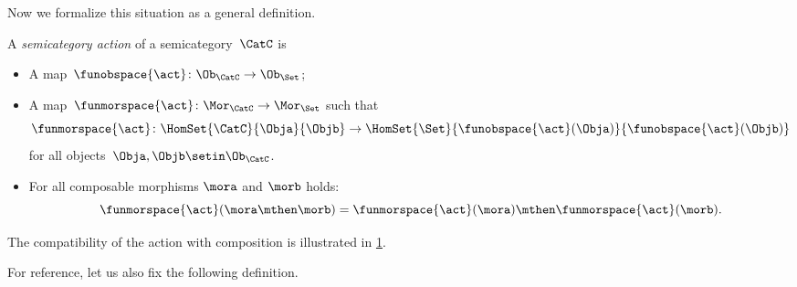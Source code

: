 Now we formalize this situation as a general definition.

\begin{ctdefinition}
    \label{def:semicategory-action}
    A \emph{semicategory action} of a semicategory~$\CatC$ is

    \constit
    \begin{itemize}
        \item A map~$\funobspace{\act} \colon \Ob_{\CatC} \to \Ob_{\Set}$;
        \item A map~$\funmorspace{\act} \colon \Mor_\CatC \to \Mor_\Set$ such that
              \begin{equation}
                  \funmorspace{\act} \colon  \HomSet{\CatC}{\Obja}{\Objb} \to \HomSet{\Set}{ \funobspace{\act}(\Obja)}{\funobspace{\act}(\Objb)}
              \end{equation}
              for all objects~$\Obja, \Objb \setin \Ob_{\CatC}$.
    \end{itemize}

    \condit

    \begin{itemize}
        \item For all composable morphisms $\mora$ and $\morb$ holds:
              \begin{equation}
                  \funmorspace{\act}(\mora \mthen \morb) = \funmorspace{\act}(\mora) \mthen \funmorspace{\act}(\morb).
              \end{equation}
    \end{itemize}
\end{ctdefinition}

The compatibility of the action with composition is illustrated in \cref{fig:semicat_ac_comm}.

\begin{figure}[h!]
    \centering
    \caption{}
    \label{fig:semicat_ac_comm}
\end{figure}

For reference, let us also fix the following definition.

